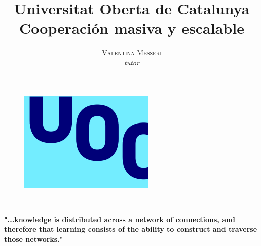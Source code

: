 \documentclass[11pt]{article}
\title{\textbf{Universitat Oberta de Catalunya }\\ %
\vspace{10pt}
{Cooperación masiva y escalable}}%
\author{\textsc{Valentina Messeri} %
\\{\textit{tutor}}} %
\date{} %
\makeatletter
\renewcommand{\maketitle} {%

\begin{center} %
{\LARGE\@title} %

\vspace{10pt} %

{\large\@author} %
\\\@date %

\vspace{10pt} %
\end{center}
}
\makeatother
\begin{document}
\textit{}
\begin{figure}[ht]\centering
\includegraphics[width=\linewidth]{logoUOC.png}
\end{figure}

\maketitle %



\begin{abstract}

\end{abstract}

\vspace{20pt} %

\begin{center}
    \begin{minipage}{0.9\linewidth}
    \vspace{5pt}%
        \textbf{ "...knowledge is distributed across a network of connections, and therefore that learning consists of the ability to construct and traverse those networks."
        }
        \begin{flushright}
        \citep {Dow12}
        \end{flushright}
    \vspace{5pt}%
    \end{minipage}
\end{center}
\renewcommand*\contentsname{Index}
\thispagestyle{empty} %
\end{document}
